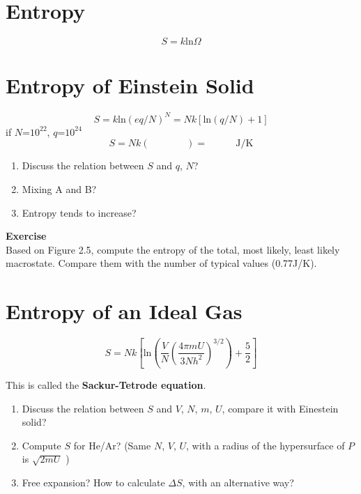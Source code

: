 


\section{Entropy}
\begin{equation} \label{entropy} 
S = k \text{ln}\Omega 
\end{equation}

\section{Entropy of Einstein Solid}
\begin{equation} \label{entropy} 
S = k\text{ln}(eq/N)^N = Nk[\text{ln}(q/N)+1]
\end{equation}
if $N$=\textrm{$10^{22}$}, $q$=\textrm{$10^{24}$}
\begin{equation} \label{entropy} 
S = Nk(~~~~~~~~~~~~~~~~~)= ~~~~~~~~~~~~~\text{J/K} 
\end{equation}

\begin{enumerate}
\item Discuss the relation between $S$ and $q$, $N$?
\item Mixing A and B?
\item Entropy tends to increase?
\end{enumerate}

{\bf Exercise} \\
Based on Figure 2.5, compute the entropy of the total, most likely, least likely macrostate. Compare them with the number of typical values (0.77J/K).

\section{Entropy of an Ideal Gas}
\begin{equation} \label{entropy} 
S = Nk[\text{ln}(\frac{V}{N} (\frac{4\pi m U}{3Nh^2})^{3/2}) + \frac{5}{2}]
\end{equation}

This is called the \textbf{Sackur-Tetrode equation}.

\begin{enumerate}
\item Discuss the relation between $S$ and $V$, $N$, $m$, $U$, compare it with Einestein solid?
\item Compute $S$ for He/Ar? (Same $N$, $V$, $U$, with a radius of the hypersurface of $P$ is $\sqrt{2mU}$ ) 
\item Free expansion? How to calculate $\Delta{S}$, with an alternative way?
\end{enumerate}

